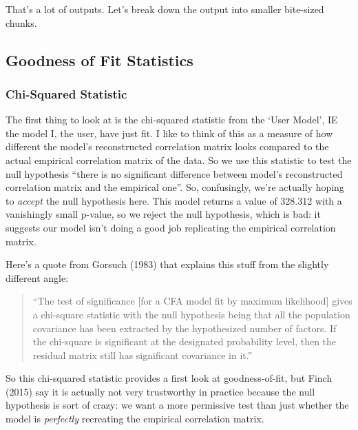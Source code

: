 \documentclass[
  letterpaper,
  DIV=11,
  numbers=noendperiod]{scrreprt}
\begin{document}
That's a lot of outputs. Let's break down the output into smaller
bite-sized chunks.

\hypertarget{goodness-of-fit-statistics}{%
\subsection*{Goodness of Fit
Statistics}\label{goodness-of-fit-statistics}}

\hypertarget{chi-squared-statistic}{%
\subsubsection*{Chi-Squared Statistic}\label{chi-squared-statistic}}

The first thing to look at is the chi-squared statistic from the `User
Model', IE the model I, the user, have just fit. I like to think of this
as a measure of how different the model's reconstructed correlation
matrix looks compared to the actual empirical correlation matrix of the
data. So we use this statistic to test the null hypothesis ``there is no
significant difference between model's reconstructed correlation matrix
and the empirical one''. So, confusingly, we're actually hoping to
\emph{accept} the null hypothesis here. This model returns a value of
328.312 with a vanishingly small p-value, so we reject the null
hypothesis, which is bad: it suggests our model isn't doing a good job
replicating the empirical correlation matrix.

Here's a quote from Gorsuch (1983) that explains this stuff from the
slightly different angle:

\begin{quote}
``The test of significance {[}for a CFA model fit by maximum
likelihood{]} gives a chi-square statistic with the null hypothesis
being that all the population covariance has been extracted by the
hypothesized number of factors. If the chi-square is significant at the
designated probability level, then the residual matrix still has
significant covariance in it.''
\end{quote}

So this chi-squared statistic provides a first look at goodness-of-fit,
but Finch (2015) say it is actually not very trustworthy in practice
because the null hypothesis is sort of crazy: we want a more permissive
test than just whether the model is \emph{perfectly} recreating the
empirical correlation matrix.
\end{document}
